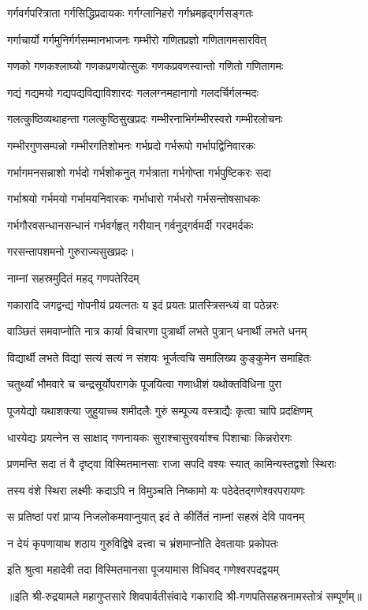 \twolineshloka
{गर्गवर्गपरित्राता गर्गसिद्धिप्रदायकः}%
{गर्गग्लानिहरो गर्गभ्रमहृद्गर्गसङ्गतः}%

\twolineshloka
{गर्गाचार्यो गर्गमुनिर्गर्गसम्मानभाजनः}%
{गम्भीरो गणितप्रज्ञो गणितागमसारवित्}%

\twolineshloka
{गणको गणकश्लाघ्यो गणकप्रणयोत्सुकः}%
{गणकप्रवणस्वान्तो गणितो गणितागमः}%

\twolineshloka
{गद्यं गद्यमयो गद्यपद्यविद्याविशारदः}%
{गललग्नमहानागो गलदर्चिर्गलन्मदः}%

\twolineshloka
{गलत्कुष्ठिव्यथाहन्ता गलत्कुष्ठिसुखप्रदः}%
{गम्भीरनाभिर्गम्भीरस्वरो गम्भीरलोचनः}%

\twolineshloka
{गम्भीरगुणसम्पन्नो गम्भीरगतिशोभनः}%
{गर्भप्रदो गर्भरूपो गर्भापद्विनिवारकः}%

\twolineshloka
{गर्भागमनसन्नाशो गर्भदो गर्भशोकनुत्}%
{गर्भत्राता गर्भगोप्ता गर्भपुष्टिकरः सदा}%

\twolineshloka
{गर्भाश्रयो गर्भमयो गर्भामयनिवारकः}%
{गर्भाधारो गर्भधरो गर्भसन्तोषसाधकः}%

\twolineshloka
{गर्भगौरवसन्धानसन्धानं गर्भवर्गहृत्}%
{गरीयान् गर्वनुद्गर्वमर्दी गरदमर्दकः}%

{गरसन्तापशमनो गुरुराज्यसुखप्रदः।}%

\onelineshloka
{नाम्नां सहस्रमुदितं महद् गणपतेरिदम्}%


\twolineshloka
{गकारादि जगद्वन्द्यं गोपनीयं प्रयत्नतः}%
{य इदं प्रयतः प्रातस्त्रिसन्ध्यं वा पठेन्नरः}%

\twolineshloka
{वाञ्छितं समवाप्नोति नात्र कार्या विचारणा}%
{पुत्रार्थी लभते पुत्रान् धनार्थी लभते धनम्}%

\twolineshloka
{विद्यार्थी लभते विद्यां सत्यं सत्यं न संशयः}%
{भूर्जत्वचि समालिख्य कुङ्कुमेन समाहितः}%

\twolineshloka
{चतुर्थ्यां भौमवारे च चन्द्रसूर्योपरागके}%
{पूजयित्वा गणाधीशं यथोक्तविधिना पुरा}%

\twolineshloka
{पूजयेद्यो यथाशक्त्या जुहुयाच्च शमीदलैः}%
{गुरुं सम्पूज्य वस्त्राद्यैः कृत्वा चापि प्रदक्षिणम्}%

\twolineshloka
{धारयेद्यः प्रयत्नेन स साक्षाद् गणनायकः}%
{सुराश्चासुरवर्याश्च पिशाचाः किन्नरोरगः}%

\twolineshloka
{प्रणमन्ति सदा तं वै दृष्ट्वा विस्मितमानसाः}%
{राजा सपदि वश्यः स्यात् कामिन्यस्तद्वशो स्थिराः}%

\twolineshloka
{तस्य वंशे स्थिरा लक्ष्मीः कदाऽपि न विमुञ्चति}%
{निष्कामो यः पठेदेतद्गणेश्वरपरायणः}%

\twolineshloka
{स प्रतिष्ठां परां प्राप्य निजलोकमवाप्नुयात्}%
{इदं ते कीर्तितं नाम्नां सहस्रं देवि पावनम्}%

\twolineshloka
{न देयं कृपणायाथ शठाय गुरुविद्विषे}%
{दत्त्वा च भ्रंशमाप्नोति देवतायाः प्रकोपतः}%

\twolineshloka
{इति श्रुत्वा महादेवी तदा विस्मितमानसा}%
{पूजयामास विधिवद् गणेश्वरपदद्वयम्}%

॥इति श्री-रुद्रयामले महागुप्तसारे शिवपार्वतीसंवादे गकारादि श्री-गणपतिसहस्रनामस्तोत्रं सम्पूर्णम्॥
